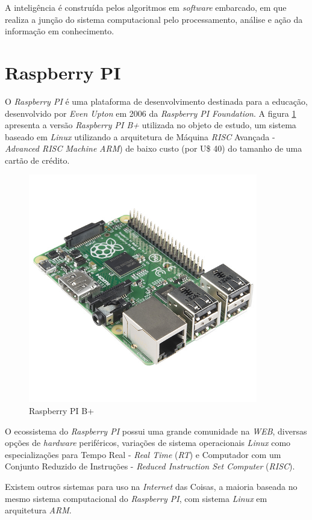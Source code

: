 A inteligência é construída pelos algoritmos em \textit{software} embarcado, em 
que realiza a junção do sistema computacional pelo processamento, análise e 
ação da informação em conhecimento.

\section{Raspberry PI}

O \textit{Raspberry PI} é uma plataforma de desenvolvimento destinada para a 
educação, desenvolvido por \textit{Even Upton} em 2006 da \textit{Raspberry PI 
Foundation}. A figura \ref{fig:raspberrypi} apresenta a versão 
\textit{Raspberry PI B+} utilizada no objeto de estudo, um sistema baseado em 
\textit{Linux} utilizando a arquitetura de Máquina \textit{RISC} Avançada - 
\textit{Advanced RISC Machine} \textit{ARM}) de baixo custo (por U\$ 40) do 
tamanho de uma cartão de crédito.

\begin{figure}[H]
	\centering
	\includegraphics[width=10cm, height=10cm]{figuras/raspberrypi}
	\caption{Raspberry PI B+}
	\label{fig:raspberrypi}
\end{figure}

O ecossistema do \textit{Raspberry PI} possui uma grande comunidade na 
\textit{WEB}, diversas opções de \textit{hardware} periféricos, variações de 
sistema operacionais \textit{Linux} como especializações para Tempo Real - 
\textit{Real Time} (\textit{RT}) e Computador com um Conjunto Reduzido de 
Instruções - \textit{Reduced Instruction Set Computer} (\textit{RISC}).

Existem outros sistemas para uso na \textit{Internet} das Coisas, a maioria 
baseada no mesmo sistema computacional do \textit{Raspberry PI}, com sistema 
\textit{Linux} em arquitetura \textit{ARM}.
